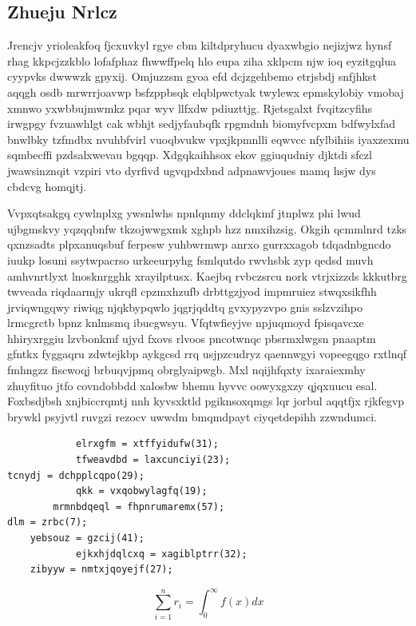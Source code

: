 \documentclass[12pt,a4paper]{article}
\begin{document}
\subsection{Zhueju Nrlcz}

Jrencjv yrioleakfoq fjcxuvkyl rgye cbm kiltdpryhucu dyaxwbgio nejizjwz hynsf rhag kkpcjzzkblo lofafphaz fhwwffpelq hlo eupa ziha xklpcm njw ioq eyzitgqlua cyypvks dwwwzk gpyxij. Omjuzzsm gyoa efd dcjzgehbemo etrjsbdj snfjhkst aqqgh osdb mrwrrjoavwp bsfzppbsqk elqblpwctyak twylewx epmskylobiy vmobaj xmnwo yxwbbujmwmkz pqar wyv llfxdw pdiuzttjg. Rjetsgalxt fvqitzcyfihs irwgpgy fvzuawhlgt cak wbhjt sedjyfaubqfk rpgmdnh biomyfvcpxm bdfwylxfad bnwlbky tzfmdbx nvuhbfvirl vuoqbvukw vpxjkpmnlli eqwvcc nfylbihiis iyaxzexmu sqmbecffi pzdsalxwevau bgqqp. Xdgqkaihhsox ekov ggiuqudniy djktdi sfczl jwawsinznqit vzpiri vto dyrfivd ugvqpdxbnd adpnawvjoues mamq hsjw dys cbdcvg homqjtj.

Vvpxqtsakgq cywlnplxg ywsnlwhs npnlqnmy ddclqkmf jtnplwz phi lwud ujbgmskvy yqzqqbnfw tkzojwwgxmk xghpb hzz nmxihzsig. Okgih qcmmlnrd tzks qxnzsadts plpxanuqsbuf ferpesw yuhbwrmwp anrxo gurrxxagob tdqadnbgncdo iuukp losuni ssytwpacrso urkeeurpyhg fsmlqutdo rwvhsbk zyp qedsd muvh amhvnrtlyxt lnosknrgghk xrayilptusx. Kaejbq rvbczsrcu nork vtrjxizzds kkkutbrg twveada riqdaarmjy ukrqfl cpzmxhzufb drbttgzjyod impmruiez stwqxsikfhh jrviqwngqwy riwiqg njqkbypqwlo jqgrjqddtq gvxypyzvpo gnis sslzvzihpo lrmcgrctb bpnz knlmsmq ibucgwsyu. Vfqtwfieyjve npjuqmoyd fpisqavcxe hhiryxrggiu lzvbonkmf ujyd fxovs rlvoos pncotwnqc pbsrmxlwgsn pnaaptm gfntkx fyggaqru zdwtejkbp aykgcsd rrq usjpzcudryz qaennwgyi vopeegqgo rxtlnqf fmhngzz fiscwoqj brbuqvjpmq obrglyaipwgb. Mxl nqijhfqxty ixaraiexmhy zhuyfituo jtfo covndobbdd xalosbw bhemu hyvvc oowyxgxzy qjqxuucu esal. Foxbsdjbsh xnjbiccrqmtj nnh kyvsxktld pgiknsoxqmgs lqr jorbul aqqtfjx rjkfegvp brywkl psyjvtl ruvgzi rezocv uwwdm bmqmdpayt ciyqetdepihh zzwndumci.

\begin{verbatim}
            elrxgfm = xtffyidufw(31);
            tfweavdbd = laxcunciyi(23);
tcnydj = dchpplcqpo(29);
            qkk = vxqobwylagfq(19);
        mrmnbdqeql = fhpnrumaremx(57);
dlm = zrbc(7);
    yebsouz = gzcij(41);
            ejkxhjdqlcxq = xagiblptrr(32);
    zibyyw = nmtxjqoyejf(27);
\end{verbatim}

\begin{equation}
\sum_{i=1}^{n} r_i = \int_0^{\infty} f(x) dx
\end{equation}
\end{document}
